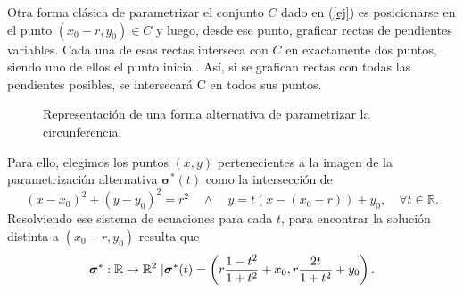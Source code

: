     
 \begin{obs}    Otra forma clásica de parametrizar el conjunto $C$ dado en (\ref{ej})  es posicionarse en el punto $(x_0-r,y_0)\in C$ y
        luego, desde ese punto,  graficar rectas de pendientes variables. Cada una de esas rectas interseca con $C$ en exactamente dos puntos,
        siendo uno de ellos el punto inicial.  Así, si se grafican rectas con todas las pendientes posibles, se intersecará C en todos sus puntos.
            \begin{figure}[H]
      \begin{center}
      \caption{Representación de una forma alternativa de parametrizar la circunferencia.}
      \end{center}
  \end{figure}
  Para ello, elegimos los puntos $(x,y)$ pertenecientes a la imagen de la parametrización alternativa $\boldsymbol{\sigma}^*(t)$ como la intersección de
        \begin{equation*}
          (x-x_0)^2+(y-y_0)^2=r^2 \quad\land\quad y=t(x-(x_0-r))+y_0,\quad \forall t\in \mathbb{R}.
        \end{equation*}
        Resolviendo ese sistema de ecuaciones para cada $t$, para encontrar la solución distinta a $(x_0-r,y_0)$ resulta que
        \begin{equation*}
          \boldsymbol{\sigma}^*:\mathbb{R}\rightarrow\mathbb{R}^2\;|\; \\ \boldsymbol{\sigma}^*(t)=\left(r\frac{1-t^2}{1+t^2}+x_0,r\frac{2t}{1+t^2}+y_0\right).
        \end{equation*}
    \end{obs}
        
    
    
    
